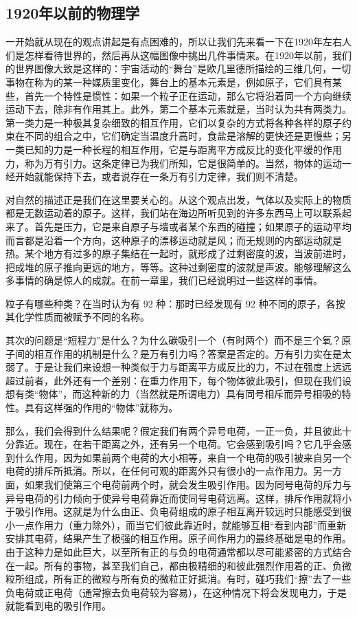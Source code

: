 \documentclass[11pt,oneside]{book}
\begin{document}
\begin{common-format}
\section{1920年以前的物理学}
一开始就从现在的观点讲起是有点困难的，所以让我们先来看一下在1920年左右人们是怎样看待世界的，然后再从这幅图像中挑出几件事情来。在1920年以前，我们的世界图像大致是这样的：宇宙活动的“舞台”是欧几里德所描绘的三维几何，一切事物在称为的某一种媒质里变化，舞台上的基本元素是，例如原子，它们具有某些，首先一个特性是惯性：如果一个粒子正在运动，那么它将沿着同一个方向继续运动下去，除非有作用其上。此外，第二个基本元素就是，当时认为共有两类力。第一类力是一种极其复杂细致的相互作用，它们以复杂的方式将各种各样的原子约束在不同的组合之中，它们确定当温度升高时，食盐是溶解的更快还是更慢些；另一类已知的力是一种长程的相互作用，它是与距离平方成反比的变化平缓的作用力，称为万有引力。这条定律已为我们所知，它是很简单的。当然，物体的运动一经开始就能保持下去，或者说存在一条万有引力定律，我们则不清楚。

对自然的描述正是我们在这里要关心的。从这个观点出发，气体以及实际上的物质都是无数运动着的原子。这样，我们站在海边所听见到的许多东西马上可以联系起来了。首先是压力，它是来自原子与墙或者某个东西的碰撞；如果原子的运动平均而言都是沿着一个方向，这种原子的漂移运动就是风；而无规则的内部运动就是热。某个地方有过多的原子集结在一起时，就形成了过剩密度的波，当波前进时，把成堆的原子推向更远的地方，等等。这种过剩密度的波就是声波。能够理解这么多事情的确是惊人的成就。在前一章里，我们已经说明过一些这样的事情。

粒子有哪些种类？在当时认为有 92 种：那时已经发现有 92 种不同的原子，各按其化学性质而被赋予不同的名称。

其次的问题是“短程力”是什么？为什么碳吸引一个（有时两个）而不是三个氧？原子间的相互作用的机制是什么？是万有引力吗？答案是否定的。万有引力实在是太弱了。于是让我们来设想一种类似于力与距离平方成反比的力，不过在强度上远远超过前者，此外还有一个差别：在重力作用下，每个物体彼此吸引，但现在我们设想有类“物体”，而这种新的力（当然就是所谓电力）具有同号相斥而异号相吸的特性。具有这样强的作用的“物体”就称为。

那么，我们会得到什么结果呢？假定我们有两个异号电荷，一正一负，并且彼此十分靠近。现在，在若干距离之外，还有另一个电荷。它会感到吸引吗？它几乎会感到什么作用，因为如果前两个电荷的大小相等，来自一个电荷的吸引被来自另一个电荷的排斥所抵消。所以，在任何可观的距离外只有很小的一点作用力。另一方面，如果我们使第三个电荷前两个时，就会发生吸引作用。因为同号电荷的斥力与异号电荷的引力倾向于使异号电荷靠近而使同号电荷远离。这样，排斥作用就将小于吸引作用。这就是为什么由正、负电荷组成的原子相互离开较远时只能感受到很小一点作用力（重力除外），而当它们彼此靠近时，就能够互相“看到内部”而重新安排其电荷，结果产生了极强的相互作用。原子间作用力的最终基础是电的作用。由于这种力是如此巨大，以至所有正的与负的电荷通常都以尽可能紧密的方式结合在一起。所有的事物，甚至我们自己，都由极精细的和彼此强烈作用着的正、负微粒所组成，所有正的微粒与所有负的微粒正好抵消。有时，碰巧我们“擦”去了一些负电荷或正电荷（通常擦去负电荷较为容易），在这种情况下将会发现电力，于是就能看到电的吸引作用。


\end{common-format}
\end{document}
